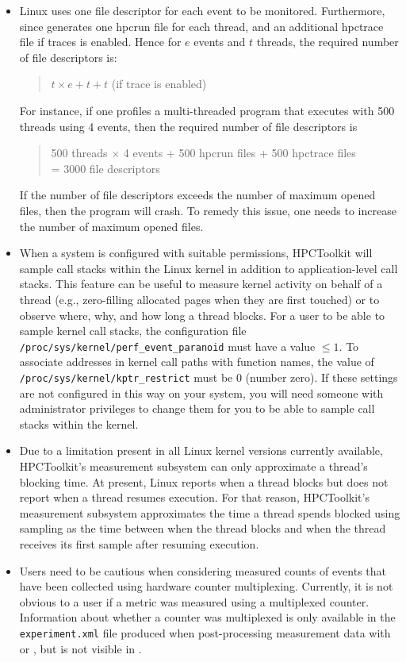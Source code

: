 \begin{itemize}
\item
Linux \perfevents{} uses one file descriptor for each event to be monitored. 
Furthermore, since \hpcrun{} generates one hpcrun file for each thread, and an additional hpctrace file if traces is enabled.
Hence for $e$ events and $t$ threads, the required number of file descriptors is: 
\begin{quote}
  $t \times e + t + t$ (if trace is enabled) 
\end{quote}
For instance, if one profiles a multi-threaded program that executes with 500 threads using 4 events, 
then the required number of file descriptors is
\begin{quote}
  500 threads $\times$ 4 events + 500 hpcrun files + 500 hpctrace files \\
  = 3000 file descriptors
\end{quote}
If the number of file descriptors exceeds the number of maximum opened files, then the program will crash. 
To remedy this issue, one needs to increase the number of maximum opened files.

\item
\sloppy
When a system is configured with suitable permissions, HPCToolkit will sample call stacks
within the Linux kernel in addition to application-level call stacks. This feature can be useful to measure kernel activity on behalf of a thread (e.g., zero-filling allocated pages when they are first touched) 
or to observe where, why, and how long a thread blocks.
For a user to be able to sample kernel call stacks, the configuration file
\verb|/proc/sys/kernel/perf_event_paranoid| must have a value $\leq 1$.  To associate addresses
in kernel call paths with function names, the value of
\verb|/proc/sys/kernel/kptr_restrict| must be 0 (number zero). If these settings are not configured in this way on your system, you will need someone with administrator privileges to change them for you to 
be able to sample call stacks within the kernel.

\item
Due to a limitation present in all Linux kernel versions currently available,  
HPCToolkit's measurement subsystem can only approximate a thread's blocking time.
At present, Linux reports when a thread blocks but does not report when a thread resumes execution.
For that reason, HPCToolkit's measurement subsystem approximates the time a thread spends blocked using sampling as the time between when the thread blocks and when the thread receives its first sample
after resuming execution.


\item
Users need to be cautious when considering measured counts of events that have been collected using 
hardware counter multiplexing.  Currently, it is not obvious to a user
if a metric was measured using a multiplexed counter. Information about whether a counter was 
multiplexed is only available in the \verb|experiment.xml| file produced when post-processing measurement data with \hpcprof{} or \hpcprofmpi, but is not visible in \hpcviewer.
\end{itemize}


